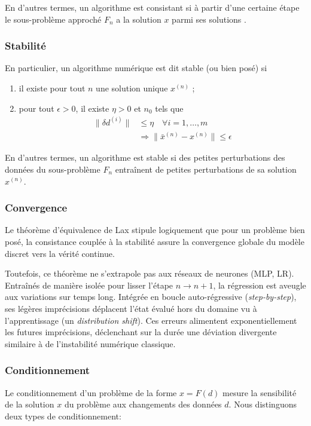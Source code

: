 \documentclass[
	a4paper, %
	10pt, %
	unnumberedsections, %
	twoside, %
]{LTJournalArticle}
\begin{document}
En d'autres termes, un algorithme est consistant si à partir d'une certaine étape
le sous-problème approché $F_n$ a la solution $x$ parmi ses solutions \cite{Marteen:2022}.


\subsubsection{Stabilité}
En particulier, un algorithme numérique est dit stable (ou bien posé) si

\begin{enumerate}
\item il existe pour tout $n$ une solution unique $x^{(n)}$ ;
\item pour tout $\epsilon > 0$, il existe $\eta > 0$ et $n_0$ tels que
\begin{align*}
\|\delta d^{(i)}\| &\le \eta \quad \forall i = 1,\ldots,m \\
&\Rightarrow \|\bar{x}^{(n)} - x^{(n)}\| \le \epsilon
\end{align*}
\end{enumerate}

En d'autres termes, un algorithme est stable si des petites perturbations des
données du sous-problème $F_n$ entraînent de petites perturbations de sa solution
$x^{(n)}$.


\subsubsection{Convergence}
Le théorème d'équivalence de Lax \cite{Marteen:2022} stipule logiquement que pour un
problème bien posé, la consistance couplée à la stabilité assure la
convergence globale du modèle discret vers la vérité continue.

Toutefois, ce théorème ne s'extrapole pas aux réseaux de neurones (MLP, LR).
Entraînés de manière isolée pour lisser l'étape $n \to n+1$, la régression est
aveugle aux variations sur temps long. Intégrée en boucle auto-régressive
(\textit{step-by-step}), ses légères imprécisions déplacent l'état évalué hors
du domaine vu à l'apprentissage (un \textit{distribution shift}). Ces erreurs
alimentent exponentiellement les futures imprécisions, déclenchant sur la durée
une déviation divergente similaire à de l'instabilité numérique classique.


\subsubsection{Conditionnement}
Le conditionnement d'un problème de la forme $x = F(d)$ mesure la sensibilité de la
solution $x$ du problème aux changements des données $d$. Nous distinguons deux types
de conditionnement:
\end{document}
